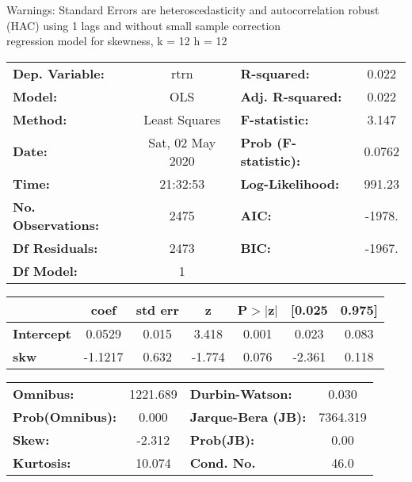 Warnings: \newline
 [1] Standard Errors are heteroscedasticity and autocorrelation robust (HAC) using 1 lags and without small sample correction\\ 

regression model for skewness, k = 12 h = 12\begin{center}
\begin{tabular}{lclc}
\toprule
\textbf{Dep. Variable:}    &       rtrn       & \textbf{  R-squared:         } &     0.022   \\
\textbf{Model:}            &       OLS        & \textbf{  Adj. R-squared:    } &     0.022   \\
\textbf{Method:}           &  Least Squares   & \textbf{  F-statistic:       } &     3.147   \\
\textbf{Date:}             & Sat, 02 May 2020 & \textbf{  Prob (F-statistic):} &   0.0762    \\
\textbf{Time:}             &     21:32:53     & \textbf{  Log-Likelihood:    } &    991.23   \\
\textbf{No. Observations:} &        2475      & \textbf{  AIC:               } &    -1978.   \\
\textbf{Df Residuals:}     &        2473      & \textbf{  BIC:               } &    -1967.   \\
\textbf{Df Model:}         &           1      & \textbf{                     } &             \\
\bottomrule
\end{tabular}
\begin{tabular}{lcccccc}
                   & \textbf{coef} & \textbf{std err} & \textbf{z} & \textbf{P$> |$z$|$} & \textbf{[0.025} & \textbf{0.975]}  \\
\midrule
\textbf{Intercept} &       0.0529  &        0.015     &     3.418  &         0.001        &        0.023    &        0.083     \\
\textbf{skw}       &      -1.1217  &        0.632     &    -1.774  &         0.076        &       -2.361    &        0.118     \\
\bottomrule
\end{tabular}
\begin{tabular}{lclc}
\textbf{Omnibus:}       & 1221.689 & \textbf{  Durbin-Watson:     } &    0.030  \\
\textbf{Prob(Omnibus):} &   0.000  & \textbf{  Jarque-Bera (JB):  } & 7364.319  \\
\textbf{Skew:}          &  -2.312  & \textbf{  Prob(JB):          } &     0.00  \\
\textbf{Kurtosis:}      &  10.074  & \textbf{  Cond. No.          } &     46.0  \\
\bottomrule
\end{tabular}
\end{center}

